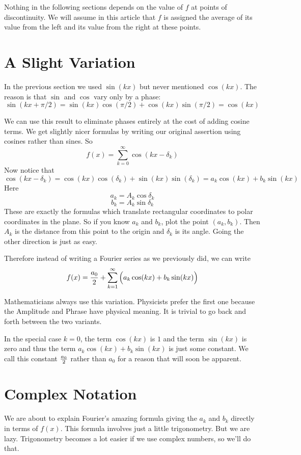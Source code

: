 \documentclass[11pt, oneside]{article}   	%
\begin{document}
Nothing in the following sections depends on the value of $f$ at points of discontinuity. We will assume in this article that $f$ is assigned the average of its value from the left and its value from the right at these points.


\section{A Slight Variation}

In the previous section we used $\sin(kx)$ but never mentioned $\cos(kx)$. 
The reason is that $\sin$ and $\cos$ vary only by a phase: 
\[\sin(kx + {\pi / 2} ) = \sin(kx) \cos (\pi / 2) + \cos(kx) \sin(\pi / 2) = \cos(kx)\] 

We can use this result to eliminate phases entirely at the cost of adding cosine terms. We get slightly nicer formulas by writing our original assertion using cosines rather than sines. So
\[f(x) = \sum_{k = 0}^\infty \cos(kx - \delta_k)\]
Now notice that
\[\cos(kx - \delta_k) = \cos(kx) \cos(\delta_k) + \sin(kx) \sin(\delta_k) = a_k \cos(kx)  + b_k \sin(kx)\]
Here
\[a_k = A_k \cos \delta_k\]
\[b_k = A_k \sin \delta_k\]
These are exactly the formulas which translate rectangular coordinates to polar coordinates in the plane. So if you know $a_k$ and $b_k$, plot the point $(a_k, b_k)$. Then $A_k$ is the distance from this point to the origin and $\delta_k$ is its angle. Going the other direction is just as easy. 

Therefore instead of writing a Fourier series as we previously did, we can write
\[f(x) = {{a_0} \over 2} + \sum_{k = 1}^\infty \Big( a_k \cos(kx) + b_k \sin(kx) \Big)\]

Mathematicians always use this variation. Physicists prefer the first one because the Amplitude and Phrase have physical meaning. It is trivial to go back and forth between the two variants.

In the special case $k = 0$, the term $\cos(kx)$ is $1$ and the term $\sin(kx)$ is zero and thus the term
$a_k \cos(kx) + b_k \sin(kx)$ is just some constant. We call this constant \({{a_0} \over 2}\) rather than $a_0$ for a reason that will soon be apparent.

\section{Complex Notation}

We are about to explain Fourier's amazing formula giving the $a_k$ and $b_k$ directly in terms of $f(x)$. This formula involves just a little trigonometry. But we are lazy. Trigonometry becomes a lot easier if we use complex numbers, so we'll do that.
\end{document}
